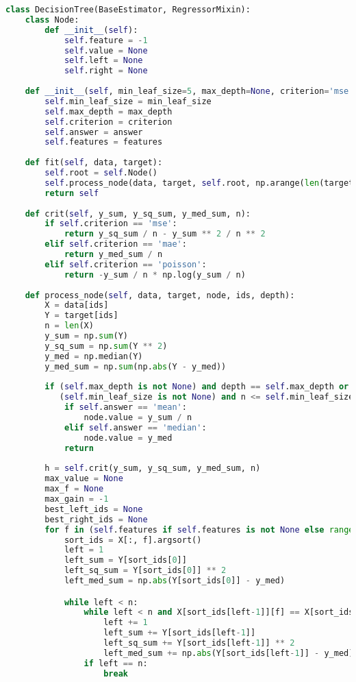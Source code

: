 \begin{lstlisting}[language=python, keepspaces=true]
class DecisionTree(BaseEstimator, RegressorMixin):
    class Node:
        def __init__(self):
            self.feature = -1
            self.value = None
            self.left = None
            self.right = None
    
    def __init__(self, min_leaf_size=5, max_depth=None, criterion='mse', answer='mean', features=None):
        self.min_leaf_size = min_leaf_size
        self.max_depth = max_depth
        self.criterion = criterion
        self.answer = answer
        self.features = features
    
    def fit(self, data, target):
        self.root = self.Node()
        self.process_node(data, target, self.root, np.arange(len(target)), 0)
        return self
    
    def crit(self, y_sum, y_sq_sum, y_med_sum, n):
        if self.criterion == 'mse':
            return y_sq_sum / n - y_sum ** 2 / n ** 2
        elif self.criterion == 'mae':
            return y_med_sum / n 
        elif self.criterion == 'poisson':
            return -y_sum / n * np.log(y_sum / n)
        
    def process_node(self, data, target, node, ids, depth):
        X = data[ids]
        Y = target[ids]
        n = len(X)
        y_sum = np.sum(Y)
        y_sq_sum = np.sum(Y ** 2)
        y_med = np.median(Y)
        y_med_sum = np.sum(np.abs(Y - y_med))
        
        if (self.max_depth is not None) and depth == self.max_depth or \
           (self.min_leaf_size is not None) and n <= self.min_leaf_size:
            if self.answer == 'mean':
                node.value = y_sum / n
            elif self.answer == 'median':
                node.value = y_med
            return
        
        h = self.crit(y_sum, y_sq_sum, y_med_sum, n)
        max_value = None
        max_f = None
        max_gain = -1
        best_left_ids = None
        best_right_ids = None
        for f in (self.features if self.features is not None else range(data.shape[1])):
            sort_ids = X[:, f].argsort()
            left = 1
            left_sum = Y[sort_ids[0]]
            left_sq_sum = Y[sort_ids[0]] ** 2
            left_med_sum = np.abs(Y[sort_ids[0]] - y_med)

            while left < n:
                while left < n and X[sort_ids[left-1]][f] == X[sort_ids[left-2]][f]:
                    left += 1
                    left_sum += Y[sort_ids[left-1]]
                    left_sq_sum += Y[sort_ids[left-1]] ** 2
                    left_med_sum += np.abs(Y[sort_ids[left-1]] - y_med)
                if left == n:
                    break
                    

\end{lstlisting}
